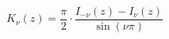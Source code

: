 \documentclass[12pt]{article}
\begin{document}
\begin{displaymath}
K_\nu(z) = \frac{\pi}{2} \cdot \frac{I_{-\nu}(z) - I_\nu(z)}{\sin(\nu\pi)}
\end{displaymath}
\end{document}
